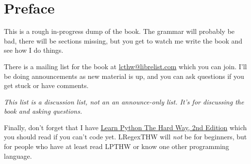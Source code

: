 \chapter*{Preface}

This is a rough in-progress dump of the book.  The grammar will probably be bad, there
will be sections missing, but you get to watch me write the book and see how I do things.

There is a mailing list for the book at
\href{mailto:lcthw@librelist.com}{lcthw@librelist.com} which you can join.
I'll be doing announcements as new material is up, and you can ask questions if
you get stuck or have comments. 

\emph{This list is a discussion list, not an an announce-only list.  It's for discussing the book and asking questions.}

Finally, don't forget that I have \href{http://learnpythonthehardway.org}{Learn
Python The Hard Way, 2nd Edition} which you should read if you can't code yet.
LRegexTHW will \emph{not} be for beginners, but for people who have at least read
LPTHW or know one other programming language.

